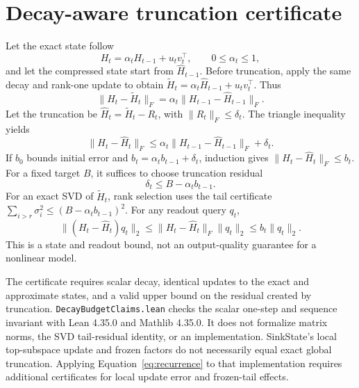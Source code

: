 \documentclass[11pt]{article}
\begin{document}
\section{Decay-aware truncation certificate}
Let the exact state follow
\begin{equation}
 H_t=\alpha_tH_{t-1}+u_tv_t^\top,\qquad 0\le\alpha_t\le1,
\end{equation}
and let the compressed state start from $\widehat H_{t-1}$. Before truncation, apply the same decay and rank-one update to obtain $\widetilde H_t=\alpha_t\widehat H_{t-1}+u_tv_t^\top$. Thus
\begin{equation}
 \|H_t-\widetilde H_t\|_F=\alpha_t\|H_{t-1}-\widehat H_{t-1}\|_F.
\end{equation}
Let the truncation be $\widehat H_t=\widetilde H_t-R_t$, with $\|R_t\|_F\le\delta_t$. The triangle inequality yields
\begin{equation}\label{eq:recurrence}
 \|H_t-\widehat H_t\|_F\le \alpha_t\|H_{t-1}-\widehat H_{t-1}\|_F+\delta_t.
\end{equation}
If $b_0$ bounds initial error and $b_t=\alpha_tb_{t-1}+\delta_t$, induction gives $\|H_t-\widehat H_t\|_F\le b_t$. For a fixed target $B$, it suffices to choose truncation residual
\begin{equation}
 \delta_t\le B-\alpha_tb_{t-1}.
\end{equation}
For an exact SVD of $\widetilde H_t$, rank selection uses the tail certificate $\sum_{i>r}\sigma_i^2\le(B-\alpha_tb_{t-1})^2$. For any readout query $q_t$,
\begin{equation}
 \|(H_t-\widehat H_t)q_t\|_2\le\|H_t-\widehat H_t\|_F\|q_t\|_2\le b_t\|q_t\|_2.
\end{equation}
This is a state and readout bound, not an output-quality guarantee for a nonlinear model.

The certificate requires scalar decay, identical updates to the exact and approximate states, and a valid upper bound on the residual created by truncation. \texttt{DecayBudgetClaims.lean} checks the scalar one-step and sequence invariant with Lean 4.35.0 and Mathlib 4.35.0. It does not formalize matrix norms, the SVD tail-residual identity, or an implementation. SinkState's local top-subspace update and frozen factors do not necessarily equal exact global truncation. Applying Equation~\ref{eq:recurrence} to that implementation requires additional certificates for local update error and frozen-tail effects.
\end{document}
